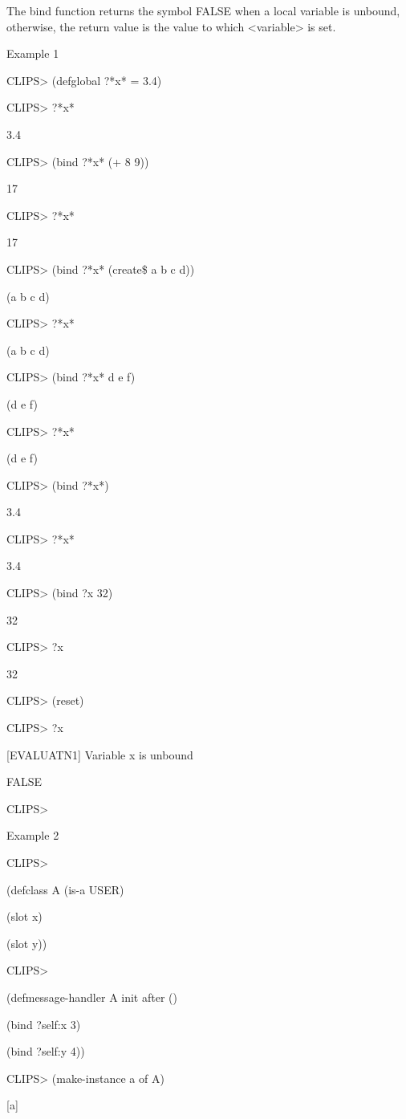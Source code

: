 \documentclass[letterpaper,10pt,english]{sphinxmanual}
\begin{document}
The bind function returns the symbol FALSE when a local variable is
unbound, otherwise, the return value is the value to which \textless{}variable\textgreater{} is
set.

Example 1

CLIPS\textgreater{} (defglobal ?*x* = 3.4)

CLIPS\textgreater{} ?*x*

3.4

CLIPS\textgreater{} (bind ?*x* (+ 8 9))

17

CLIPS\textgreater{} ?*x*

17

CLIPS\textgreater{} (bind ?*x* (create\$ a b c d))

(a b c d)

CLIPS\textgreater{} ?*x*

(a b c d)

CLIPS\textgreater{} (bind ?*x* d e f)

(d e f)

CLIPS\textgreater{} ?*x*

(d e f)

CLIPS\textgreater{} (bind ?*x*)

3.4

CLIPS\textgreater{} ?*x*

3.4

CLIPS\textgreater{} (bind ?x 32)

32

CLIPS\textgreater{} ?x

32

CLIPS\textgreater{} (reset)

CLIPS\textgreater{} ?x

{[}EVALUATN1{]} Variable x is unbound

FALSE

CLIPS\textgreater{}

Example 2

CLIPS\textgreater{}

(defclass A (is-a USER)

(slot x)

(slot y))

CLIPS\textgreater{}

(defmessage-handler A init after ()

(bind ?self:x 3)

(bind ?self:y 4))

CLIPS\textgreater{} (make-instance a of A)

{[}a{]}
\end{document}
